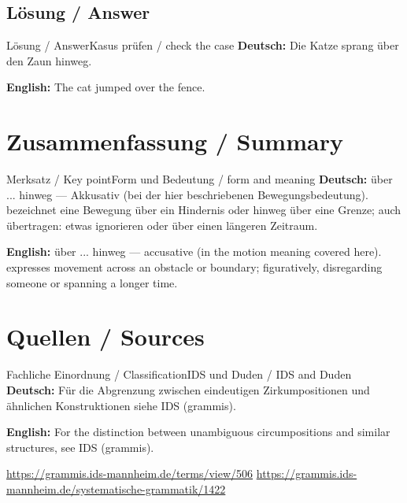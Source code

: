 \documentclass[a4paper,11pt]{article}
\newcommand{\GermanText}[1]{\textbf{Deutsch: }#1\par}
\newcommand{\EnglishText}[1]{{\small\color{SoftGray}\textbf{English: }#1\par}}
\begin{document}
\subsection{Lösung / Answer}
\begin{grammarentry}{Lösung / Answer}{Kasus prüfen / check the case}
\GermanText{Die Katze sprang über den Zaun hinweg.}
\EnglishText{The cat jumped over the fence.}
\end{grammarentry}
\section{Zusammenfassung / Summary}
\begin{grammarentry}{Merksatz / Key point}{Form und Bedeutung / form and meaning}
\GermanText{über ... hinweg — Akkusativ (bei der hier beschriebenen Bewegungsbedeutung). bezeichnet eine Bewegung über ein Hindernis oder hinweg über eine Grenze; auch übertragen: etwas ignorieren oder über einen längeren Zeitraum.}
\EnglishText{über ... hinweg — accusative (in the motion meaning covered here). expresses movement across an obstacle or boundary; figuratively, disregarding someone or spanning a longer time.}
\end{grammarentry}
\section{Quellen / Sources}
\begin{grammarentry}{Fachliche Einordnung / Classification}{IDS und Duden / IDS and Duden}
\GermanText{Für die Abgrenzung zwischen eindeutigen Zirkumpositionen und ähnlichen Konstruktionen siehe IDS (grammis).}
\EnglishText{For the distinction between unambiguous circumpositions and similar structures, see IDS (grammis).}
\url{https://grammis.ids-mannheim.de/terms/view/506}
\url{https://grammis.ids-mannheim.de/systematische-grammatik/1422}
\end{grammarentry}
\end{document}
